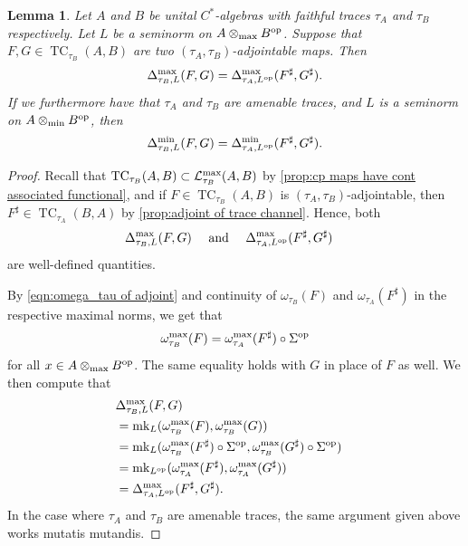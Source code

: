 \documentclass[11pt, a4paper, oneside, final, reqno]{amsart}
\newcommand{\calL}{\mathcal{L}}
\newcommand{\TC}{\operatorname{TC}}
\newcommand{\mk}{\operatorname{mk}}
\theoremstyle{definition}
\theoremstyle{plain}
\newtheorem{lemma}[definition]{Lemma}
\theoremstyle{remark}
\numberwithin{equation}{section}
\begin{document}
\begin{lemma}\label{lemma:distance between adjoints}
    Let $A$ and $B$ be unital $C^*$-algebras with faithful traces $\tau_A$ and $\tau_B$ respectively. Let $L$ be a seminorm on $A \otimes_{\rm max} B^{\rm op}$. Suppose that $F,G \in \TC_{\tau_B}(A,B)$ are two $(\tau_A,\tau_B)$-adjointable maps. Then
    \begin{equation*}
        \Delta_{\tau_B,L}^{\rm max}(F,G) = \Delta_{\tau_A,L^{\rm op}}^{\rm max}(F^\sharp,G^\sharp).
    \end{equation*}
    If we furthermore have that $\tau_A$ and $\tau_B$ are amenable traces, and $L$ is a seminorm on $A \otimes_{\rm min} B^{\rm op}$, then
    \begin{equation*}
        \Delta_{\tau_B,L}^{\rm min}(F,G) = \Delta_{\tau_A,L^{\rm op}}^{\rm min}(F^\sharp,G^\sharp).
    \end{equation*}
\end{lemma}
\begin{proof}
    Recall that $\TC_{\tau_B}(A,B) \subset \calL_{\tau_B}^{\rm max}(A,B)$ by \cref{prop:cp maps have cont associated functional}, and if $F \in \TC_{\tau_B}(A,B)$ is $(\tau_A,\tau_B)$-adjointable, then $F^\sharp \in \TC_{\tau_A}(B,A)$ by \cref{prop:adjoint of trace channel}. Hence, both
    \begin{align*}
        \Delta_{\tau_B,L}^{\rm max}(F,G) & \quad \text{ and }  \quad
        \Delta_{\tau_A,L^{\rm op}}^{\rm max}(F^\sharp,G^\sharp)
    \end{align*}
    are well-defined quantities.

    By \eqref{eqn:omega_tau of adjoint} and continuity of $\omega_{\tau_B}(F)$ and $\omega_{\tau_A}(F^\sharp)$ in the respective maximal norms, we get that
    \begin{equation*}
        \omega_{\tau_B}^{\rm max}(F) = \omega_{\tau_A}^{\rm max}(F^\sharp) \circ \Sigma^{\rm op}
    \end{equation*}
    for all $x \in A \otimes_{\rm max} B^{\rm op}$. The same equality holds with $G$ in place of $F$ as well. We then compute that
    \begin{align*}
        & \Delta_{\tau_B,L}^{\rm max}(F,G) & \\
        & = \mk_{L}(\omega_{\tau_B}^{\rm max}(F),\omega_{\tau_B}^{\rm max}(G)) & \\
        & = \mk_{L}(\omega_{\tau_B}^{\rm max}(F^\sharp)\circ\Sigma^{\rm op},\omega_{\tau_B}^{\rm max}(G^\sharp)\circ\Sigma^{\rm op}) & \\
        & = \mk_{L^{\rm op}}(\omega_{\tau_A}^{\rm max}(F^\sharp),\omega_{\tau_A}^{\rm max}(G^\sharp)) & \\
        & = \Delta_{\tau_A,L^{\rm op}}^{\rm max}(F^\sharp,G^\sharp). &
    \end{align*}
    In the case where $\tau_A$ and $\tau_B$ are amenable traces, the same argument given above works mutatis mutandis.
\end{proof}
\end{document}

